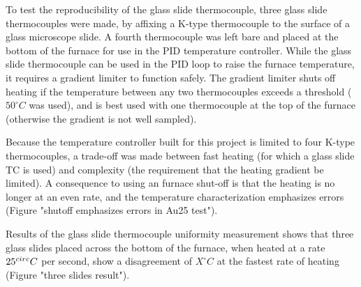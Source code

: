 	To test the reproducibility of the glass slide thermocouple, three glass slide thermocouples were made, by affixing a K-type thermocouple to the surface of a glass microscope slide.
	A fourth thermocouple was left bare and placed at the bottom of the furnace for use in the PID temperature controller.
	While the glass slide thermocouple can be used in the PID loop to raise the furnace temperature, it requires a gradient limiter to function safely.  
	The gradient limiter shuts off heating if the temperature between any two thermocouples exceeds a threshold ($50^{\circ}C$ was used), and is best used with one thermocouple at the top of the furnace (otherwise the gradient is not well sampled).

	Because the temperature controller built for this project is limited to four K-type thermocouples, a trade-off was made between fast heating (for which a glass slide TC is used) and complexity (the requirement that the heating gradient be limited). 
	A consequence to using an furnace shut-off is that the heating is no longer at an even rate, and the temperature characterization emphasizes errors (Figure "shutoff emphasizes errors in Au25 test").

	Results of the glass slide thermocouple uniformity measurement shows that three glass slides placed across the bottom of the furnace, when heated at a rate $25^{\/circ}C$ per second, show a disagreement of $X^{\circ}C$ at the fastest rate of heating (Figure "three slides result").

	\clearpage
	
